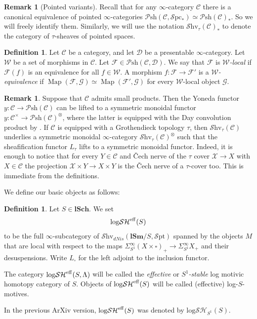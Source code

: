 \documentclass[11pt, a4paper]{amsart}
\theoremstyle{definition}
\newtheorem{df}[thm]{Definition}
\newtheorem{rmk}[thm]{Remark}
\numberwithin{equation}{subsection}
\newcommand{\lSch}{\mathbf{lSch}}
\newcommand{\lSm}{\mathbf{lSm}}
\newcommand{\cC}{\mathcal{C}}
\newcommand{\cF}{\mathcal{F}}
\newcommand{\cG}{\mathcal{G}}
\newcommand{\cW}{\mathcal{W}}
\newcommand{\sX}{\mathscr{X}}
\newcommand{\boxx}{\square}
\newcommand{\eff}{{\rm eff}}
\newcommand{\infSpcpt}{\mathcal{S}\mathrm{pc}_\ast}
\newcommand{\infPsh}{\mathcal{P}\mathrm{sh}}
\newcommand{\infShv}{\mathcal{S}\mathrm{hv}}
\newcommand{\infSpt}{\mathcal{S}\mathrm{pt}}
\newcommand{\Map}{\operatorname{Map}}
\newcommand{\infC}{\mathcal{C}}
\newcommand{\infD}{\mathcal{D}}
\newcommand{\inflogSH}{\mathrm{log}\mathcal{SH}}
\begin{document}
\begin{rmk}[Pointed variants] Recall that for any $\infty$-category $\infC$ there is a canonical equivalence of pointed $\infty$-categories  $\infPsh(\infC,\infSpcpt)
\simeq
\infPsh(\infC)_\ast$. So we will freely identify them. Similarly, we will use the notation $\infShv_\tau(\infC)_\ast$ to denote the category of $\tau$-sheaves of pointed spaces.
\end{rmk}

\begin{df}
Let $\cC$ be a category, and let $\infD$ be a presentable $\infty$-category. Let $\cW$ be a set of morphisms in $\cC$. Let $\cF\in \infPsh(\cC, \infD)$.
We say that $\cF$ is \emph{$\cW$-local} if $\cF(f)$ is an equivalence for all $f\in \cW$. A morphism $f\colon\cF\to \cF'$ is a \emph{$\cW$-equivalence} if $\Map(\cF,\cG) \simeq \Map (\cF', \cG)$ for every $\cW$-local object $\cG$.
\end{df}

\begin{rmk} Suppose that $\infC$ admits small products. Then the Yoneda functor $y\colon \infC \to \infPsh(\infC)$ can be lifted to a symmetric monoidal functor $y\colon \infC^{\times} \to \infPsh(\infC)^{\otimes}$, where the latter is equipped with the Day convolution product by \cite[Corollary 4.8.1.12]{HA}. If $\infC$ is  equipped with a Grothendieck topology $\tau$, then $\infShv_\tau(\infC)$ underlies a symmetric monoidal $\infty$-category $\infShv_\tau(\infC)^\otimes$ such that the sheafification functor $L_\tau$ lifts to a symmetric monoidal functor.  
Indeed, it is enough to notice that for every $Y\in \infC$ and \v{C}ech nerve of the $\tau$ cover $\sX\to X$ with 
$X\in \cC$ the projection 
$\sX\times Y\to X\times Y$ is the \v{C}ech nerve of a $\tau$-cover too.
This is immediate from the definitions.
\end{rmk}




We define our basic objects as follows:
\begin{df}\label{def:logH_andvariants}
Let $S\in \lSch$.
We set 
\[\inflogSH^{\eff}(S)\] to be the full $\infty$-subcategory of $\infShv_{dNis}(\lSm/S,\infSpt)$ spanned by the objects $M$ that are local with respect to the maps $\Sigma_{S^1}^\infty(X \times \boxx)_+ \to \Sigma^\infty_{S^1}X_+$ and their desuspensions. Write $L_\boxx$ for the left adjoint to the inclusion functor.




The category $\inflogSH^{\eff}(S, \Lambda)$ will be called the \emph{effective} or \emph{$S^1$-stable} log motivic homotopy category of $S$. Objects of $\inflogSH^{\eff}(S)$ will be called (effective) log-$S$-motives.

In the previous ArXiv version, $\inflogSH^\eff(S)$ was denoted by $\inflogSH_{S^1}(S)$.
\end{df}
\end{document}
